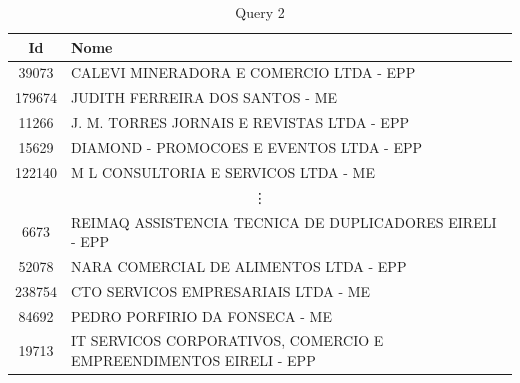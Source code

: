 \documentclass{article}
\begin{document}
\begin{table}[H]
  \centering
  \begin{tabular}{cl}
    Id & Nome \\
    \midrule
    39073  &	CALEVI MINERADORA E COMERCIO LTDA - EPP \\
    179674 &	JUDITH FERREIRA DOS SANTOS - ME \\
    11266  &	J. M. TORRES JORNAIS E REVISTAS LTDA - EPP \\
    15629  &	DIAMOND - PROMOCOES E EVENTOS LTDA - EPP \\
    122140 &	M L CONSULTORIA E SERVICOS LTDA - ME \\
    \multicolumn{2}{c}{\vdots} \\
    6673   &	REIMAQ ASSISTENCIA TECNICA DE DUPLICADORES EIRELI - EPP \\
    52078  &	NARA COMERCIAL DE ALIMENTOS LTDA - EPP \\
    238754 &	CTO SERVICOS EMPRESARIAIS LTDA - ME \\
    84692  &	PEDRO PORFIRIO DA FONSECA - ME \\
    19713  &	IT SERVICOS CORPORATIVOS, COMERCIO E EMPREENDIMENTOS EIRELI - EPP \\
    \bottomrule
  \end{tabular}
  \caption*{Query 2}
\end{table}
\end{document}
